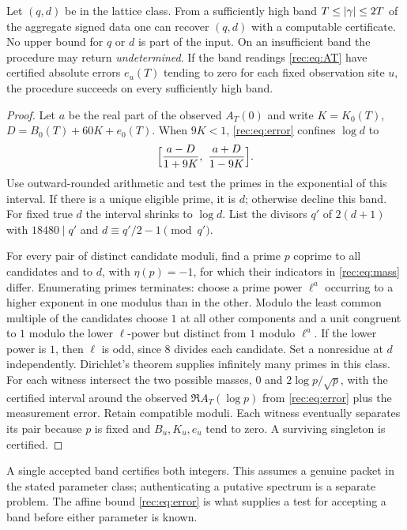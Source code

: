 \begin{theorem}\label{rec:thm:band}
Let $(q,d)$ be in the lattice class. From a sufficiently high band $T\le\lvert\gamma\rvert\le2T$ of
the aggregate signed data one can recover $(q,d)$ with a computable certificate. No upper
bound for $q$ or $d$ is part of the input. On an insufficient band the procedure may return
\emph{undetermined}. If the band readings \eqref{rec:eq:AT} have certified absolute errors
$e_u(T)$ tending to zero for each fixed observation site $u$, the procedure succeeds on
every sufficiently high band.
\end{theorem}
\begin{proof}
Let $a$ be the real part of the observed $A_T(0)$ and write $K=K_0(T)$,
$D=B_0(T)+60K+e_0(T)$. When $9K<1$, \eqref{rec:eq:error} confines $\log d$ to
\[
 \Bigl[\frac{a-D}{1+9K},\ \frac{a+D}{1-9K}\Bigr].
\]
Use outward-rounded arithmetic and test the primes in the exponential of this interval. If
there is a unique eligible prime, it is $d$; otherwise decline this band. For fixed true $d$
the interval shrinks to $\log d$. List the divisors $q'$ of $2(d+1)$ with $18480\mid q'$ and
$d\equiv q'/2-1\pmod{q'}$.

For every pair of distinct candidate moduli, find a prime $p$ coprime to all candidates and
to $d$, with $\eta(p)=-1$, for which their indicators in \eqref{rec:eq:mass} differ.
Enumerating primes terminates: choose a prime power $\ell^a$ occurring to a higher exponent
in one modulus than in the other. Modulo the least common multiple of the candidates choose
$1$ at all other components and a unit congruent to $1$ modulo the lower $\ell$-power but
distinct from $1$ modulo $\ell^a$. If the lower power is $1$, then $\ell$ is odd, since $8$
divides each candidate. Set a nonresidue at $d$ independently. Dirichlet's theorem supplies
infinitely many primes in this class. For each witness intersect the two possible masses,
$0$ and $2\log p/\sqrt p$, with the certified interval around the observed
$\Re A_T(\log p)$ from \eqref{rec:eq:error} plus the measurement error. Retain compatible
moduli. Each witness eventually separates its pair because $p$ is fixed and $B_u,K_u,e_u$
tend to zero. A surviving singleton is certified.
\end{proof}

A single accepted band certifies both integers. This assumes a genuine packet in the stated
parameter class; authenticating a putative spectrum is a separate problem. The affine bound
\eqref{rec:eq:error} is what supplies a test for accepting a band before either parameter is
known.

